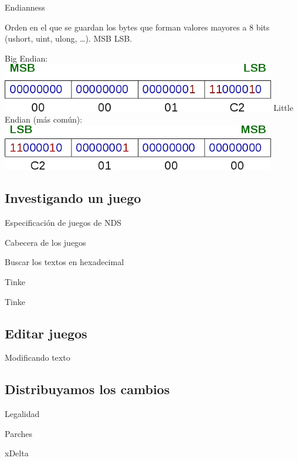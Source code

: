 \begin{frame}{Endianness}
    \begin{block}{}
        Orden en el que se guardan los bytes que forman valores mayores a 8 bits (ushort, uint, ulong, \ldots). MSB \textrightarrow LSB.
    \end{block}
    \centering{}Big Endian:
    \includegraphics[width=0.9\textwidth]{big_endian.png}
    \vfill
    Little Endian (más común):
    \includegraphics[width=0.9\textwidth]{little_endian.png}
\end{frame}

\subsection{Investigando un juego}
\begin{frame}{Especificación de juegos de NDS}
\end{frame}

\begin{frame}{Cabecera de los juegos}
\end{frame}

\begin{frame}{Buscar los textos en hexadecimal}
\end{frame}

\begin{frame}{Tinke}
\end{frame}

\begin{frame}{Tinke}
\end{frame}

\subsection{Editar juegos}
\begin{frame}{Modificando texto}
\end{frame}

\subsection{Distribuyamos los cambios}
\begin{frame}{Legalidad}
\end{frame}

\begin{frame}{Parches}
\end{frame}

\begin{frame}{xDelta}
\end{frame}
